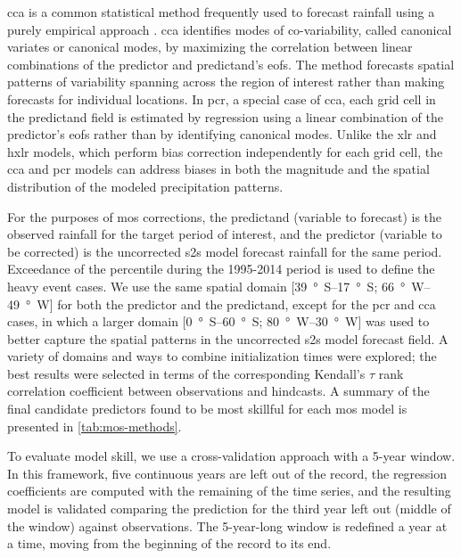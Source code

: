 \documentclass[twocol]{ametsoc}
\begin{document}
\Gls{cca} is a common statistical method frequently used to forecast rainfall using a purely empirical approach \citep{Mason2008,Barnston2012,Jolliffe2012,Barnston1992,Wilks2006}.
\Gls{cca} identifies modes of co-variability, called canonical variates or canonical modes, by maximizing the correlation between linear combinations of the predictor and predictand's \glspl{eof}.
The method forecasts spatial patterns of variability spanning across the region of interest rather than making forecasts for individual locations.
In \gls{pcr}, a special case of \gls{cca}, each grid cell in the predictand field is estimated by regression using a linear combination of the predictor's \glspl{eof} \citep{Mason2008,Wilks2006} rather than by identifying canonical modes.
Unlike the \gls{xlr} and \gls{hxlr} models, which perform bias correction independently for each grid cell, the \gls{cca} and \gls{pcr} models can address biases in both the magnitude and the spatial distribution of the modeled precipitation patterns.

For the purposes of \gls{mos} corrections, the predictand (variable to forecast) is the observed rainfall for the target period of interest, and the predictor (variable to be corrected) is the uncorrected \gls{s2s} model forecast rainfall for the same period.
Exceedance of the  percentile during the 1995-2014 period is used to define the heavy event cases.
We use the same spatial domain [\SIrange{39}{17}{\degree S}; \SIrange{66}{49}{\degree W}] for both the predictor and the predictand, except for the \gls{pcr} and \gls{cca} cases, in which a larger domain [\SIrange{0}{60}{\degree S}; \SIrange{80}{30}{\degree W}] was used to better capture the spatial patterns in the uncorrected \gls{s2s} model forecast field.
A variety of domains and ways to combine initialization times were explored; the best results were selected in terms of the corresponding Kendall's $\tau$ rank correlation coefficient between observations and hindcasts.
A summary of the final candidate predictors found to be most skillful for each \gls{mos} model is presented in \cref{tab:mos-methods}.

To evaluate model skill, we use a cross-validation approach with a 5-year window.
In this framework, five continuous years are left out of the record, the regression coefficients are computed with the remaining of the time series, and the resulting model is validated comparing the prediction for the third year left out (middle of the window) against observations.
The 5-year-long window is redefined a year at a time, moving from the beginning of the record to its end.
\end{document}

